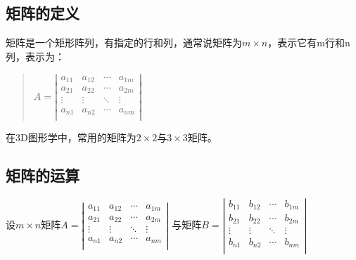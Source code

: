 \documentclass[a4paper,10pt]{article}
\begin{document}
\begin{CJK}{UTF8}{song}
\subsection{矩阵的定义}
矩阵是一个矩形阵列，有指定的行和列，通常说矩阵为$m\times n$，表示它有m行和n列，表示为：
\begin{quote}
\begin{math}
A=\left|
\begin{array}{cccc}
a_{11} & a_{12} & \cdots & a_{1m} \\
a_{21} & a_{22} & \cdots & a_{2m} \\
\vdots & \vdots & \ddots & \vdots \\
a_{n1} & a_{n2} & \cdots & a_{nm} \\
\end{array}
   \right|
\end{math}
\end{quote}
在3D图形学中，常用的矩阵为$2\times 2$与$3\times 3$矩阵。
\subsection{矩阵的运算}
设$m\times n$矩阵$
A=\left|
\begin{array}{cccc}
a_{11} & a_{12} & \cdots & a_{1m} \\
a_{21} & a_{22} & \cdots & a_{2m} \\
\vdots & \vdots & \ddots & \vdots \\
a_{n1} & a_{n2} & \cdots & a_{nm} \\
\end{array}
   \right|
$
与矩阵$
B=\left|
\begin{array}{cccc}
b_{11} & b_{12} & \cdots & b_{1m} \\
b_{21} & b_{22} & \cdots & b_{2m} \\
\vdots & \vdots & \ddots & \vdots \\
b_{n1} & b_{n2} & \cdots & b_{nm} \\
\end{array}
   \right|
$


\end{CJK}
\end{document}
